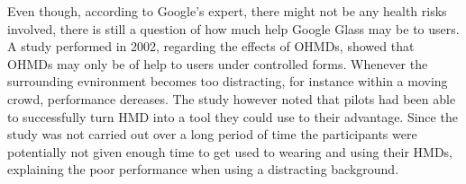 %
%
Even though, according to Google's expert, there might not be any health risks involved, there is still a question of how much help Google Glass may be to users. A study performed in 2002\cite{laramee02}, regarding the effects of OHMDs, showed that OHMDs may only be of help to users under controlled forms. Whenever the surrounding evnironment becomes too distracting, for instance within a moving crowd, performance dereases. The study however noted that pilots had been able to successfully turn HMD into a tool they could use to their advantage. Since the study was not carried out over a long period of time the participants were potentially not given enough time to get used to wearing and using their HMDs, explaining the poor performance when using a distracting background.

